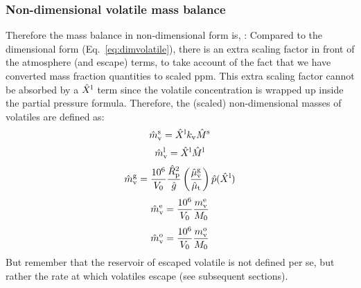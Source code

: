 \subsubsection{Non-dimensional volatile mass balance}
Therefore the mass balance in non-dimensional form is, :
Compared to the dimensional form (Eq.~\ref{eq:dimvolatile}), there is an extra scaling factor in front of the atmosphere (and escape) terms, to take account of the fact that we have converted mass fraction quantities to scaled ppm.  This extra scaling factor cannot be absorbed by a $\hat{X}^{\rm l}$ term since the volatile concentration is wrapped up inside the partial pressure formula.  Therefore, the (scaled) non-dimensional masses of volatiles are defined as:
\begin{equation}
\hat{m}_{\rm v}^{\rm s} = \hat{X}^{\rm l} k_{\rm v} \hat{M}^{\rm s}
\end{equation}
\begin{equation}
\hat{m}_{\rm v}^{\rm l} = \hat{X}^{\rm l} \hat{M}^{\rm l}
\end{equation}
\begin{equation}
\hat{m}_{\rm v}^{\rm g} = \frac{10^6}{V_0} \frac{\hat{R}_{\rm p}^2}{\hat{g}} \left( \frac{\hat{\mu}_{\rm v}^{\rm g}}{\hat{\mu}_{\rm t}} \right) \hat{p} (\hat{X}^{\rm l})
\end{equation}
\begin{equation}
\hat{m}_{\rm v}^{\rm e} = \frac{10^6}{V_0} \frac{m_{\rm v}^{\rm e}}{M_0}
\end{equation}
\begin{equation}
\hat{m}_{\rm v}^{\rm o} = \frac{10^6}{V_0} \frac{m_{\rm v}^{\rm o}}{M_0}
\end{equation}
But remember that the reservoir of escaped volatile is not defined per se, but rather the rate at which volatiles escape (see subsequent sections).

